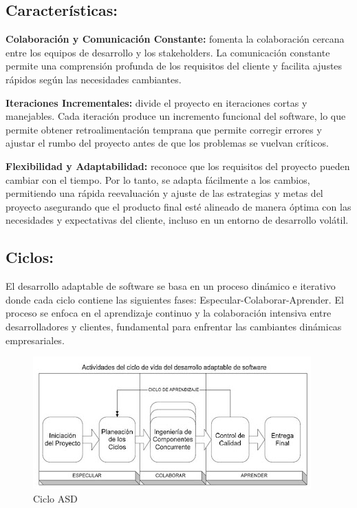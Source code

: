 \documentclass[
  10,
  openany]{book}
\begin{document}
\hypertarget{caracteruxedsticas}{%
\subsection{Características:}\label{caracteruxedsticas}}

\textbf{Colaboración y Comunicación Constante:} fomenta la colaboración cercana entre los equipos de desarrollo y los stakeholders. La comunicación constante permite una comprensión profunda de los requisitos del cliente y facilita ajustes rápidos según las necesidades cambiantes.

\textbf{Iteraciones Incrementales:} divide el proyecto en iteraciones cortas y manejables. Cada iteración produce un incremento funcional del software, lo que permite obtener retroalimentación temprana que permite corregir errores y ajustar el rumbo del proyecto antes de que los problemas se vuelvan críticos.

\textbf{Flexibilidad y Adaptabilidad:} reconoce que los requisitos del proyecto pueden cambiar con el tiempo. Por lo tanto, se adapta fácilmente a los cambios, permitiendo una rápida reevaluación y ajuste de las estrategias y metas del proyecto asegurando que el producto final esté alineado de manera óptima con las necesidades y expectativas del cliente, incluso en un entorno de desarrollo volátil.

\hypertarget{ciclos}{%
\subsection{Ciclos:}\label{ciclos}}

El desarrollo adaptable de software se basa en un proceso dinámico e iterativo donde cada ciclo contiene las siguientes fases: Especular-Colaborar-Aprender. El proceso se enfoca en el aprendizaje continuo y la colaboración intensiva entre desarrolladores y clientes, fundamental para enfrentar las cambiantes dinámicas empresariales.

\begin{figure}

{\centering \includegraphics[width=0.6\linewidth]{images/04-metodologia/02_ciclo} 

}

\caption{Ciclo ASD}\label{fig:metdas}
\end{figure}
\end{document}
